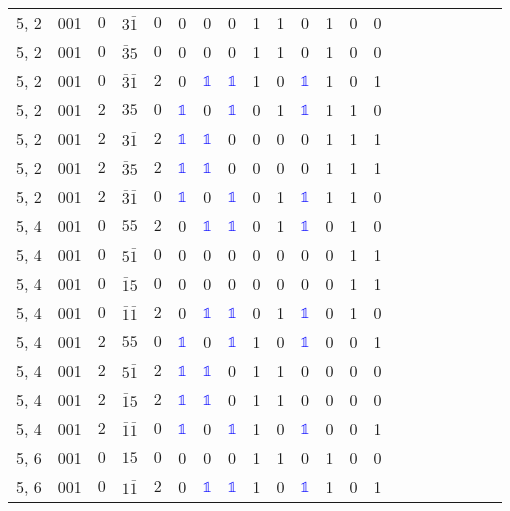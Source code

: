 \begin{longtable*}{c| cccccccccccccccccccc }
5, 2& 001& $0$& $3\bar{1}$& $0$& 0& 0& 0& 1& 1& 0& 1& 0& 0\\
5, 2& 001& $0$& $\bar{3}5$& $0$& 0& 0& 0& 1& 1& 0& 1& 0& 0\\
5, 2& 001& $0$& $\bar{3}\bar{1}$& $2$& 0& \textcolor{blue}{$\mathds{1}$}& \textcolor{blue}{$\mathds{1}$}& 1& 0& \textcolor{blue}{$\mathds{1}$}& 1& 0& 1\\
5, 2& 001& $2$& $35$& $0$& \textcolor{blue}{$\mathds{1}$}& 0& \textcolor{blue}{$\mathds{1}$}& 0& 1& \textcolor{blue}{$\mathds{1}$}& 1& 1& 0\\
5, 2& 001& $2$& $3\bar{1}$& $2$& \textcolor{blue}{$\mathds{1}$}& \textcolor{blue}{$\mathds{1}$}& 0& 0& 0& 0& 1& 1& 1\\
5, 2& 001& $2$& $\bar{3}5$& $2$& \textcolor{blue}{$\mathds{1}$}& \textcolor{blue}{$\mathds{1}$}& 0& 0& 0& 0& 1& 1& 1\\
5, 2& 001& $2$& $\bar{3}\bar{1}$& $0$& \textcolor{blue}{$\mathds{1}$}& 0& \textcolor{blue}{$\mathds{1}$}& 0& 1& \textcolor{blue}{$\mathds{1}$}& 1& 1& 0\\
5, 4& 001& $0$& $55$& $2$& 0& \textcolor{blue}{$\mathds{1}$}& \textcolor{blue}{$\mathds{1}$}& 0& 1& \textcolor{blue}{$\mathds{1}$}& 0& 1& 0\\
5, 4& 001& $0$& $5\bar{1}$& $0$& 0& 0& 0& 0& 0& 0& 0& 1& 1\\
5, 4& 001& $0$& $\bar{1}5$& $0$& 0& 0& 0& 0& 0& 0& 0& 1& 1\\
5, 4& 001& $0$& $\bar{1}\bar{1}$& $2$& 0& \textcolor{blue}{$\mathds{1}$}& \textcolor{blue}{$\mathds{1}$}& 0& 1& \textcolor{blue}{$\mathds{1}$}& 0& 1& 0\\
5, 4& 001& $2$& $55$& $0$& \textcolor{blue}{$\mathds{1}$}& 0& \textcolor{blue}{$\mathds{1}$}& 1& 0& \textcolor{blue}{$\mathds{1}$}& 0& 0& 1\\
5, 4& 001& $2$& $5\bar{1}$& $2$& \textcolor{blue}{$\mathds{1}$}& \textcolor{blue}{$\mathds{1}$}& 0& 1& 1& 0& 0& 0& 0\\
5, 4& 001& $2$& $\bar{1}5$& $2$& \textcolor{blue}{$\mathds{1}$}& \textcolor{blue}{$\mathds{1}$}& 0& 1& 1& 0& 0& 0& 0\\
5, 4& 001& $2$& $\bar{1}\bar{1}$& $0$& \textcolor{blue}{$\mathds{1}$}& 0& \textcolor{blue}{$\mathds{1}$}& 1& 0& \textcolor{blue}{$\mathds{1}$}& 0& 0& 1\\
5, 6& 001& $0$& $15$& $0$& 0& 0& 0& 1& 1& 0& 1& 0& 0\\
5, 6& 001& $0$& $1\bar{1}$& $2$& 0& \textcolor{blue}{$\mathds{1}$}& \textcolor{blue}{$\mathds{1}$}& 1& 0& \textcolor{blue}{$\mathds{1}$}& 1& 0& 1\\

\end{longtable*}
